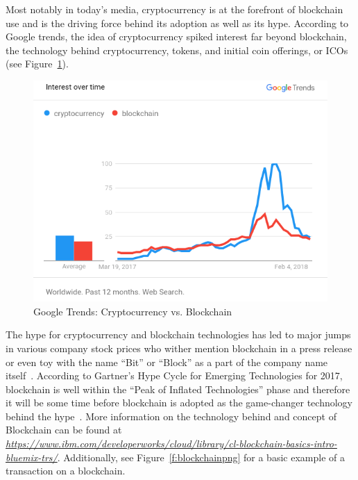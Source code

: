 Most notably in today's media, cryptocurrency is at the forefront of blockchain use and is the driving force behind its adoption as well as its hype. According to Google trends, the idea of cryptocurrency spiked interest far beyond blockchain, the technology behind cryptocurrency, tokens, and initial coin offerings, or ICOs (see Figure~\ref{f:googletrendchart}). 
\begin{figure}[!ht]
  \centering\includegraphics[width=\columnwidth]{../images/trendscryptoblockchain.png}
  \caption{Google Trends: Cryptocurrency vs. Blockchain~\cite{GoogleTrendsCrypto-Blockchain}}\label{f:googletrendchart}
\end{figure}
The hype for cryptocurrency and blockchain technologies has led to major jumps in various company stock prices who wither mention blockchain in a press release or even toy with the name ``Bit'' or ``Block'' as a part of the company name itself~\cite{ReutersKodak}. According to Gartner's Hype Cycle for Emerging Technologies for 2017, blockchain is well within the ``Peak of Inflated Technologies'' phase and therefore it will be some time before blockchain is adopted as the game-changer technology behind the hype~\cite{GartnerHypeTechnology2017}. More information on the technology behind and concept of Blockchain can be found at \textit{\url{https://www.ibm.com/developerworks/cloud/library/cl-blockchain-basics-intro-bluemix-trs/}}. Additionally, see Figure~\ref{f:blockchainpng} for a basic example of a transaction on a blockchain.

